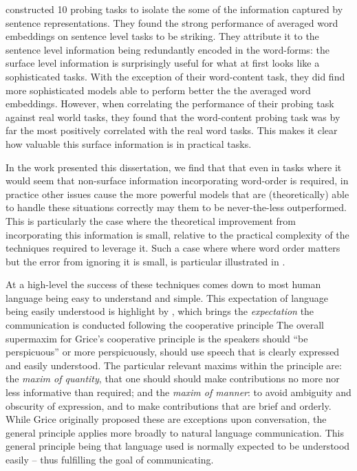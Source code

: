 \documentclass{book}
\begin{document}
\citet{ac2018probingsentencevectors} constructed 10 probing tasks to isolate the some of the information captured by sentence representations.
They found the strong performance of averaged word embeddings on sentence level tasks to be striking.
They attribute it to the sentence level information being redundantly encoded in the word-forms: the surface level information is surprisingly useful for what at first looks like a sophisticated tasks.
With the exception of their word-content task, they did find more sophisticated models able to perform better the the averaged word embeddings.
However, when correlating the performance of their probing task against real world tasks,
they found that the word-content probing task was by far the most positively correlated with the real word tasks.
This makes it clear how valuable this surface information is in practical tasks.



In the work presented this dissertation, 
we find that that even in tasks where it would seem that non-surface information incorporating word-order is required,
in practice other issues cause the more powerful models that are (theoretically) able to handle these situations correctly may them to be never-the-less outperformed.
This is particularly the case where the theoretical improvement from incorporating this information is small, relative to the practical complexity of the techniques required to leverage it.
Such a case where where word order matters but the error from ignoring it is small, is particular illustrated in .

At a high-level the success of these techniques comes down to most human language being easy to understand and simple.
This expectation of language being easily understood is highlight by \citep{grice1975logic}, which brings the \emph{expectation} the communication is conducted following the cooperative principle
The overall supermaxim for Grice's cooperative principle is the speakers should ``be perspicuous'' or more perspicuously, should use speech that is clearly expressed and easily understood.
The particular relevant maxims within the principle are:
the \emph{maxim of quantity}, that one should should make contributions no more nor less informative than required;
and the \emph{maxim of manner}: to avoid ambiguity and obscurity of expression, and to make contributions that are brief and orderly.
While Grice originally proposed these are exceptions upon conversation, the general principle applies more broadly to natural language communication.
This general principle being that language used is normally expected to be understood easily -- thus fulfilling the goal of communicating.
\end{document}
